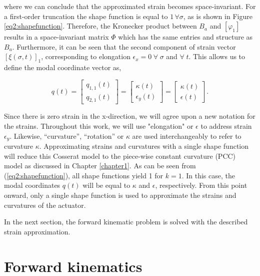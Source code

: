 where we can conclude that the approximated strain becomes space-invariant. For a first-order truncation the shape function is equal to $1 \hspace{2pt} \forall \sigma$, as is shown in Figure \ref{eq2:shapefunction}. Therefore, the Kronecker product between $B_a$ and $[\varphi_1]$ results in a space-invariant matrix $\Phi$ which has the same entries and structure as $B_a$. Furthermore, it can be seen that the second component of strain vector $[\xi(\sigma,t)]_1$, corresponding to elongation $\epsilon_x = 0 \hspace{3pt} \forall \hspace{3pt} \sigma $ and $ \forall \hspace{3pt} t$. This allows us to define the modal coordinate vector as,


\begin{equation}
q(t) = \begin{bmatrix} q_{1,1}(t) \\ q_{2,1}(t) \end{bmatrix} = \begin{bmatrix} \kappa(t) \\ \epsilon_y(t) \end{bmatrix} = \begin{bmatrix} \kappa(t) \\ \epsilon(t) \end{bmatrix}.
\end{equation}

Since there is zero strain in the x-direction, we will agree upon a new notation for the strains. Throughout this work, we will use "elongation" or $\epsilon$ to address strain $\epsilon_y$. Likewise, ``curvature'', ``rotation'' or  $\kappa$ are used interchangeably to refer to curvature $\kappa$. Approximating strains and curvatures with a single shape function will reduce this Cosserat model to the piece-wise constant curvature (PCC) model as discussed in Chapter \ref{chapter1}. As can be seen from (\ref{eq2:shapefunction}), all shape functions yield 1 for $k=1$. In this case, the modal coordinates $q(t)$ will be equal to $\kappa$ and $\epsilon$, respectively. From this point onward, only a single shape function is used to approximate the strains and curvatures of the actuator. 

In the next section, the forward kinematic problem is solved with the described strain approximation.




\section{Forward kinematics}

